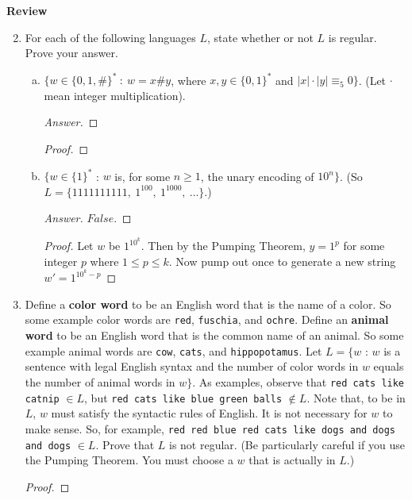 \documentclass[10pt]{article}
\newcommand{\card}[1]{\left| #1 \right|}
\begin{document}
\noindent
\textbf{Review}
\begin{enumerate}[1)]
\setcounter{enumi}{1}

\item
For each of the following languages $L$, state whether or not $L$ is regular. Prove your answer.
\begin{enumerate}[a)]
\item
$\{w \in \{0, 1, \#\}^*\ :\ w = x\#y$, where $x, y \in \{0, 1\}^*$ and $\card{x}\cdot \card{y} \equiv _5 0\}$.  (Let $\cdot$ mean integer multiplication).
\begin{proof}[Answer]
\end{proof}
\begin{proof}[Proof]
\end{proof}

\item
$\{w \in \{1\}^*$ : $w$ is, for some $n \geq 1$, the unary encoding of $10^n\}$.  (So $L = \{1111111111,\ 1^{100},\ 1^{1000},\ \ldots\}$.)
\begin{proof}[Answer]
$False$.
\end{proof}
\begin{proof}[Proof]
Let $w$ be $1^{10^k}$.  Then by the Pumping Theorem, $y = 1^p$ for some integer $p$ where $1 \leq p \leq k$.  Now pump out once to generate a new string $w' = 1^{10^k - p}$
\end{proof}
\end{enumerate}



\item
Define a \textbf{color word} to be an English word that is the name of a color.  So some example color words are \texttt{red}, \texttt{fuschia}, and \texttt{ochre}.  Define an \textbf{animal word} to be an English word that is the common name of an animal.  So some example animal words are \texttt{cow}, \texttt{cats}, and \texttt{hippopotamus}.  Let $L = \{w$ : $w$ is a sentence with legal English syntax and the number of color words in $w$ equals the number of animal words in $w\}$.  As examples, observe that \texttt{red cats like catnip} $\in L$, but \texttt{red cats like blue green balls} $\not \in L$.  Note that, to be in $L$, $w$ must satisfy the syntactic rules of English.  It is not necessary for $w$ to make sense.  So, for example, \texttt{red red blue red cats like dogs and dogs and dogs} $\in L$.  Prove that $L$ is not regular.  (Be particularly careful if you use the Pumping Theorem.  You must choose a $w$ that is actually in $L$.)
\begin{proof}[Proof]
\end{proof}



\end{enumerate}
\end{document}
